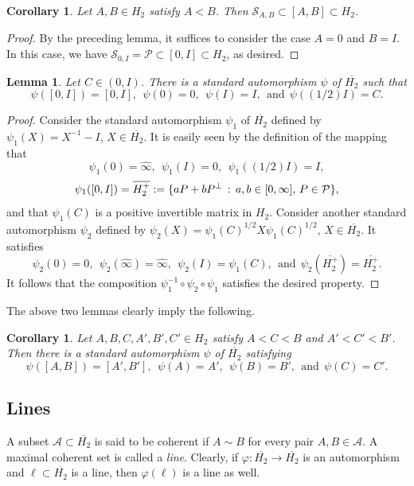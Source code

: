 \documentclass[10pt]{amsart}
\newtheorem{lemma}[theorem]{Lemma}
\newtheorem{corollary}[theorem]{Corollary}
\theoremstyle{definition}
\theoremstyle{remark}
\numberwithin{subsection}{section}
\numberwithin{equation}{section}
\newcommand\cP{{\mathcal{P}}}
\newcommand\oH{{\overline{H_2}}}
\newcommand\oHp{{\overline{H_2^+}}}
\newcommand\oi{{\widehat{\infty}}}
\begin{document}
\begin{corollary}\label{A<B}
Let $A, B\in H_2$ satisfy $A<B$. 
Then $\mathcal{S}_{A,B}\subset [A,B]\subset H_2$. 
\end{corollary}
\begin{proof}
By the preceding lemma, it suffices to consider the case $A=0$ and $B=I$. 
In this case, we have $\mathcal{S}_{0,I}=\cP\subset [0,I]\subset H_2$, as desired.
\end{proof}


\begin{lemma}\label{order}
Let $C \in (0,I)$. 
There is a standard automorphism $\psi$ of $\oH$ such that 
\[
\psi([0, I])=[0, I],\ \  \psi(0)=0,\ \  \psi(I)=I,\ \  \text{and}\ \  \psi((1/2)I)=C.
\] 
\end{lemma}

\begin{proof}
Consider the standard automorphism $\psi_1$ of $\oH$ defined by $\psi_1(X)=X^{-1}-I$, $X\in \oH$. 
It is easily seen by the definition of the mapping that 
\[
\psi_1(0)=\oi,\ \ \psi_1(I)=0,\ \  \psi_1((1/2)I)=I,
\]
\[
\psi_1([0, I])=\oHp:=\{aP+bP^{\perp}\,:\, a, b\in [0, \infty],\, P\in \mathcal{P}\}, \index{$Hp$@$\oHp$}
\] and that $\psi_1(C)$ is a positive invertible matrix in $H_2$. 
Consider another standard automorphism $\psi_2$ defined by $\psi_2(X)=\psi_1(C)^{1/2}X\psi_1(C)^{1/2}$, $X\in \oH$. 
It satisfies 
\[
\psi_2(0)=0,\ \ \psi_2(\oi)=\oi,\ \ \psi_2(I)=\psi_1(C),\ \ \text{and}\ \  \psi_2(\oHp)=\oHp.
\] 
It follows that the composition $\psi_1^{-1}\circ\psi_2\circ \psi_1$ satisfies the desired property.
\end{proof}

The above two lemmas clearly imply the following.

\begin{corollary}\label{cororder}
Let $A, B, C, A',B',C'\in H_2$ satisfy $A<C<B$ and $A'<C'<B'$.
Then there is a standard automorphism $\psi$ of $\oH$ satisfying 
\[
\psi([A, B])=[A', B'],\ \  \psi(A)=A',\ \  \psi(B)=B',\ \  \text{and}\ \  \psi(C)=C'.
\] 
\end{corollary}



\subsection{Lines}\label{line}
A subset $\mathcal{A} \subset \oH$ is said to be coherent  if $A \sim B$ for every pair $A,B \in \mathcal{A}$. A maximal coherent set is called a \emph{line}. Clearly, if $\varphi \colon \oH \to \oH$ is an automorphism and $\ell \subset \oH$ is a line, then $\varphi ( \ell)$ is a line as well.
\end{document}
